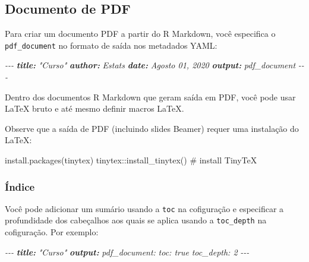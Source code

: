 \documentclass[
]{book}
\newenvironment{Shaded}{\begin{snugshade}}{\end{snugshade}}
\newcommand{\AnnotationTok}[1]{\textcolor[rgb]{0.56,0.35,0.01}{\textbf{\textit{#1}}}}
\newcommand{\CommentTok}[1]{\textcolor[rgb]{0.56,0.35,0.01}{\textit{#1}}}
\newcommand{\NormalTok}[1]{#1}
\begin{document}
\hypertarget{documento-de-pdf}{%
\subsection{Documento de PDF}\label{documento-de-pdf}}

Para criar um documento PDF a partir do R Markdown, você especifica o \texttt{pdf\_document} no formato de saída nos metadados YAML:

\begin{Shaded}
\begin{Highlighting}[]
\CommentTok{{-}{-}{-}}
\AnnotationTok{title:}\CommentTok{ "Curso"}
\AnnotationTok{author:}\CommentTok{ Estats}
\AnnotationTok{date:}\CommentTok{ Agosto 01, 2020}
\AnnotationTok{output:}\CommentTok{ pdf\_document}
\CommentTok{{-}{-}{-}}
\end{Highlighting}
\end{Shaded}

Dentro dos documentos R Markdown que geram saída em PDF, você pode usar LaTeX bruto e até mesmo definir macros LaTeX.

Observe que a saída de PDF (incluindo slides Beamer) requer uma instalação do LaTeX:

\begin{Shaded}
\begin{Highlighting}[]
\NormalTok{install.packages(\textquotesingle{}tinytex\textquotesingle{})}
\NormalTok{tinytex::install\_tinytex()  \# install TinyTeX}
\end{Highlighting}
\end{Shaded}

\hypertarget{uxedndice}{%
\subsubsection{Índice}\label{uxedndice}}

Você pode adicionar um sumário usando a \texttt{toc} na cofiguração e especificar a profundidade dos cabeçalhos aos quais se aplica usando a \texttt{toc\_depth} na cofiguração. Por exemplo:

\begin{Shaded}
\begin{Highlighting}[]
\CommentTok{{-}{-}{-}}
\AnnotationTok{title:}\CommentTok{ "Curso"}
\AnnotationTok{output:}
\CommentTok{  pdf\_document:}
\CommentTok{    toc: true}
\CommentTok{    toc\_depth: 2}
\CommentTok{{-}{-}{-}}
\end{Highlighting}
\end{Shaded}
\end{document}
